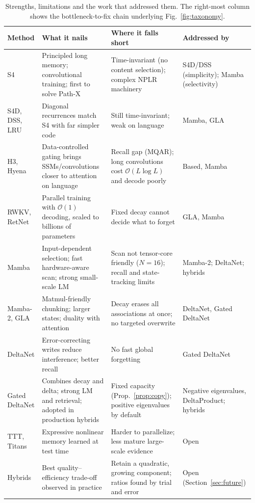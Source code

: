 \documentclass[a4paper]{article}
\newcommand{\bigO}{\mathcal{O}}
\theoremstyle{plain}
\theoremstyle{remark}
\begin{document}
\begin{table}[t]
\centering
\caption{Strengths, limitations and the work that addressed them. The right-most column shows the bottleneck-to-fix chain underlying Fig.~\ref{fig:taxonomy}.}
\label{tab:critique}
\footnotesize
\renewcommand{\arraystretch}{1.2}
\begin{tabularx}{\textwidth}{@{}>{\raggedright\arraybackslash}p{2.35cm} >{\raggedright\arraybackslash}X >{\raggedright\arraybackslash}X >{\raggedright\arraybackslash}p{2.9cm}@{}}
\toprule
\textbf{Method} & \textbf{What it nails} & \textbf{Where it falls short} & \textbf{Addressed by} \\
\midrule
S4 \citep{gu2022s4} & Principled long memory; convolutional training; first to solve Path-X & Time-invariant (no content selection); complex NPLR machinery & S4D/DSS (simplicity); Mamba (selectivity) \\
S4D, DSS, LRU & Diagonal recurrences match S4 with far simpler code & Still time-invariant; weak on language & Mamba, GLA \\
H3, Hyena & Data-controlled gating brings SSMs/convolutions closer to attention on language & Recall gap (MQAR); long convolutions cost $\bigO(L\log L)$ and decode poorly & Based, Mamba \\
RWKV, RetNet & Parallel training with $\bigO(1)$ decoding, scaled to billions of parameters & Fixed decay cannot decide what to forget & GLA, Mamba \\
Mamba & Input-dependent selection; fast hardware-aware scan; strong small-scale LM & Scan not tensor-core friendly ($N{=}16$); recall and state-tracking limits & Mamba-2; DeltaNet; hybrids \\
Mamba-2, GLA & Matmul-friendly chunking; larger states; duality with attention & Decay erases all associations at once; no targeted overwrite & DeltaNet, Gated DeltaNet \\
DeltaNet & Error-correcting writes reduce interference; better recall & No fast global forgetting & Gated DeltaNet \\
Gated DeltaNet & Combines decay and delta; strong LM and retrieval; adopted in production hybrids & Fixed capacity (Prop.~\ref{prop:copy}); positive eigenvalues by default & Negative eigenvalues, DeltaProduct; hybrids \\
TTT, Titans & Expressive nonlinear memory learned at test time & Harder to parallelize; less mature large-scale evidence & Open \\
Hybrids & Best quality--efficiency trade-off observed in practice & Retain a quadratic, growing component; ratios found by trial and error & Open (Section~\ref{sec:future}) \\
\bottomrule
\end{tabularx}
\end{table}
\end{document}
